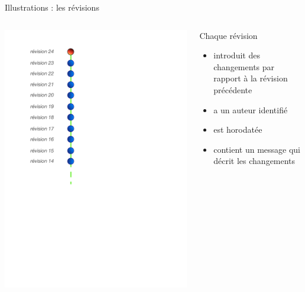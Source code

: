 \begin{frame}{%
\protect\hypertarget{illustrations-les-ruxe9visions}{%
Illustrations : les révisions}}

\begin{columns}[T]
\begin{column}{0.40\textwidth}
\includegraphics[height=1.5\textwidth]{images/revisions.pdf}
\end{column}

\begin{column}{0.60\textwidth}
Chaque révision

\begin{itemize}
\tightlist
\item
  introduit des changements par rapport à la révision précédente
\item
  a un auteur identifié
\item
  est horodatée
\item
  contient un message qui décrit les changements
\end{itemize}
\end{column}
\end{columns}

\end{frame}


